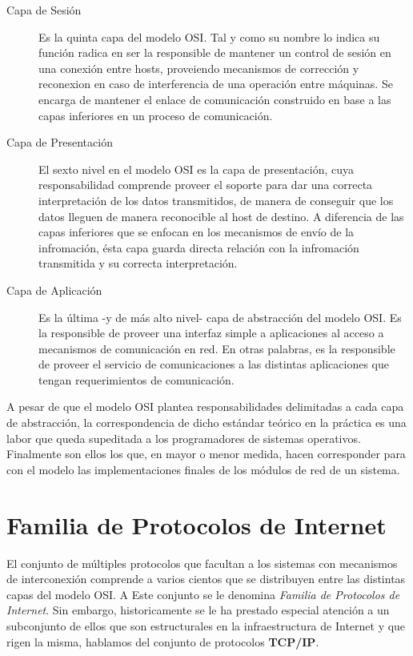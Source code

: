 \begin{description}
\item[Capa de Sesión] Es la quinta capa del modelo OSI. Tal y como su nombre lo indica su función radica en ser la responsible de mantener un control de sesión en una conexión entre hosts, proveiendo mecanismos de corrección y reconexion en caso de interferencia de una operación entre máquinas. Se encarga de mantener el enlace de comunicación construido en base a las capas inferiores en un proceso de comunicación.

\item[Capa de Presentación] El sexto nivel en el modelo OSI es la capa de presentación, cuya responsabilidad comprende proveer el soporte para dar una correcta interpretación de los datos transmitidos, de manera de conseguir que los datos lleguen de manera reconocible al host de destino. A diferencia de las capas inferiores que se enfocan en los mecanismos de envío de la infromación, ésta capa guarda directa relación con la infromación transmitida y su correcta interpretación.

\item[Capa de Aplicación] Es la última -y de más alto nivel- capa de abstracción del modelo OSI. Es la responsible de proveer una interfaz simple a aplicaciones al acceso a mecanismos de comunicación en red. En otras palabras, es la responsible de proveer el servicio de comunicaciones a las distintas aplicaciones que tengan requerimientos de comunicación.

\end{description}

A pesar de que el modelo OSI plantea responsabilidades delimitadas a cada capa de abstracción, la correspondencia de dicho estándar teórico en la práctica es una labor que queda supeditada a los programadores de sistemas operativos. Finalmente son ellos los que, en mayor o menor medida, hacen corresponder para con el modelo las implementaciones finales de los módulos de red de un sistema.


\section{Familia de Protocolos de Internet}
El conjunto de múltiples protocolos que facultan a los sistemas con mecanismos de interconexión comprende a varios cientos que se distribuyen entre las distintas capas del modelo OSI. A Este conjunto se le denomina \emph{Familia de Protocolos de Internet}. Sin embargo, historicamente se le ha prestado especial atención a un subconjunto de ellos que son estructurales en la infraestructura de Internet y que rigen la misma, hablamos del conjunto de protocolos \textbf{TCP/IP}.

